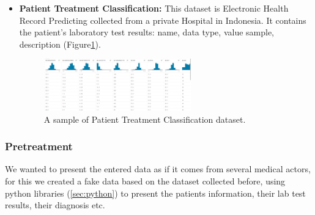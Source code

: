 \begin{itemize}
  \item \textbf{Patient Treatment Classification:} This dataset is Electronic Health Record Predicting collected from a private Hospital in Indonesia. It contains the patient's laboratory test results: name, data type, value sample, description (Figure\ref{fig:treat}).
  \begin{figure}[h!]
    \center
    \includegraphics[width=0.60\textwidth]{images/chapter3/dataset/treat.PNG}
    \caption{A sample of Patient Treatment Classification dataset.}
    \label{fig:treat}
  \end{figure}
  
  \end{itemize}
  \newpage
\subsubsection*{Pretreatment}
We wanted to present the entered data as if it comes from several medical actors, for this we created a fake data based on the dataset collected before, using python libraries (\ref{sec:python}) to present the patients information, their lab test results, their diagnosis etc.


